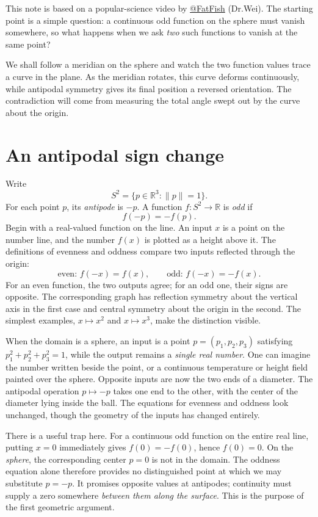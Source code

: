 
This note is based on a popular-science video by \href{https://chaoli.club/index.php/member/1202}{@FatFish} (Dr.Wei). The starting point is a simple question: a continuous odd function on the sphere must vanish somewhere, so what happens when we ask \emph{two} such functions to vanish at the same point?

We shall follow a meridian on the sphere and watch the two function values trace a curve in the plane. As the meridian rotates, this curve deforms continuously, while antipodal symmetry gives its final position a reversed orientation. The contradiction will come from measuring the total angle swept out by the curve about the origin.

\section{An antipodal sign change}

Write
\[
 S^2=\{p\in\mathbb R^3:\|p\|=1\}.
\]
For each point $p$, its \emph{antipode} is $-p$. A function $f:S^2\to\mathbb R$ is \emph{odd} if
\[
 f(-p)=-f(p).
\]
Begin with a real-valued function on the line. An input \(x\) is a point on the number line, and the number \(f(x)\) is plotted as a height above it. The definitions of evenness and oddness compare two inputs reflected through the origin:
\[
 \text{even: }f(-x)=f(x),
 \qquad
 \text{odd: }f(-x)=-f(x).
\]
For an even function, the two outputs agree; for an odd one, their signs are opposite. The corresponding graph has reflection symmetry about the vertical axis in the first case and central symmetry about the origin in the second. The simplest examples, \(x\mapsto x^2\) and \(x\mapsto x^3\), make the distinction visible.

When the domain is a sphere, an input is a point \(p=(p_1,p_2,p_3)\) satisfying \(p_1^2+p_2^2+p_3^2=1\), while the output remains a \emph{single real number}. One can imagine the number written beside the point, or a continuous temperature or height field painted over the sphere. Opposite inputs are now the two ends of a diameter. The antipodal operation \(p\mapsto-p\) takes one end to the other, with the center of the diameter lying inside the ball. The equations for evenness and oddness look unchanged, though the geometry of the inputs has changed entirely.

There is a useful trap here. For a continuous odd function on the entire real line, putting \(x=0\) immediately gives \(f(0)=-f(0)\), hence \(f(0)=0\). On the \emph{sphere}, the corresponding center \(p=0\) is not in the domain. The oddness equation alone therefore provides no distinguished point at which we may substitute \(p=-p\). It promises opposite values at antipodes; continuity must supply a zero somewhere \emph{between them along the surface}. This is the purpose of the first geometric argument.

